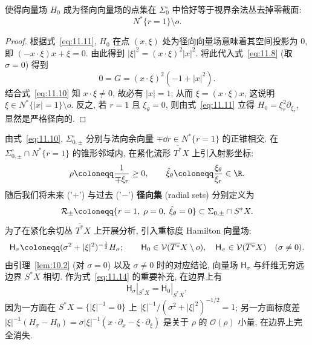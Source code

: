 \begin{lemma}[$H_0$ 的径向集]\label{lem:11.3}
使得向量场 $H_0$ 成为径向向量场的点集在 $\Sigma_0^\circ$ 中恰好等于视界余法丛去掉零截面:
\[
    N^*\{r = 1\} \setminus o.
\]
\end{lemma}

\begin{proof}
根据式~\eqref{eq:11.11}, $H_0$ 在点 $(x, \xi)$ 处为径向向量场意味着其空间投影为 0, 即 $(-x\cdot\xi)x + \xi = 0$. 由此得到 $|\xi|^2 = (x\cdot\xi)^2 |x|^2$. 将此代入式~\eqref{eq:11.8} (取 $\sigma = 0$) 得到
\begin{equation}\label{eq:11.17}
    0 = G = (x\cdot\xi)^2(-1 + |x|^2).
\end{equation}
结合式~\eqref{eq:11.10} 知 $x\cdot\xi \ne 0$, 故必有 $|x| = 1$; 从而 $\xi = (x\cdot\xi)x$, 这说明 $\xi \in N^*\{|x| = 1\} \setminus o$. 反之, 若 $r = 1$ 且 $\xi_\theta = 0$, 则由式~\eqref{eq:11.11} 立得 $H_0 = \xi_r^2 \partial_{\xi_r}$, 显然是严格径向的.
\end{proof}

由式~\eqref{eq:11.10}, $\Sigma_{0, \pm}^\circ$ 分别与法向余向量 $\mp \dd r \in N^*\{r = 1\}$ 的正锥相交. 在 $\Sigma_{0, \pm}^\circ \cap N^*\{r = 1\}$ 的锥形邻域内, 在紧化流形 $\overline{T^*} X$ 上引入射影坐标:
\begin{equation}\label{eq:11.18}
    \rho \defeq \frac{1}{\mp \xi_r} \ge 0, \qquad \hat{\xi}_\theta \defeq \frac{\xi_\theta}{\xi_r} \in \R.
\end{equation}
随后我们将未来 ('$+$') 与过去 ('$-$') \textbf{径向集} (radial sets) 分别定义为
\begin{equation}\label{eq:11.19}
    \mathcal{R}_\pm \defeq \{r = 1, \; \rho = 0, \; \hat{\xi}_\theta = 0\} \subset \Sigma_{0, \pm} \cap S^* X.
\end{equation}
为了在紧化余切丛 $\overline{T^*} X$ 上开展分析, 引入重标度 Hamilton 向量场:
\begin{equation}\label{eq:11.20}
    \mathsf{H}_\sigma \defeq (\sigma^2 + |\xi|^2)^{-\frac{1}{2}} H_\sigma; \qquad \mathsf{H}_0 \in \mathcal{V}(\overline{T^*} X \setminus o), \quad \mathsf{H}_\sigma \in \mathcal{V}(\overline{T^*} X) \quad (\sigma \ne 0).
\end{equation}
由引理~\ref{lem:10.2} (对 $\sigma = 0$) 以及 $\sigma \ne 0$ 时的对应结论, 向量场 $\mathsf{H}_\sigma$ 与纤维无穷远边界 $S^* X$ 相切. 作为式~\eqref{eq:11.14} 的重要补充, 在边界上有
\begin{equation}\label{eq:11.21}
    \mathsf{H}_\sigma|_{S^* X} = \mathsf{H}_0|_{S^* X},
\end{equation}
因为一方面在 $S^* X = \{|\xi|^{-1} = 0\}$ 上 $|\xi|^{-1}/(\sigma^2 + |\xi|^2)^{-1/2} = 1$; 另一方面标度差 $|\xi|^{-1}(H_\sigma - H_0) = \sigma |\xi|^{-1}(x\cdot\partial_x - \xi\cdot\partial_\xi)$ 是关于 $\rho$ 的 $\mathcal{O}(\rho)$ 小量, 在边界上完全消失.

